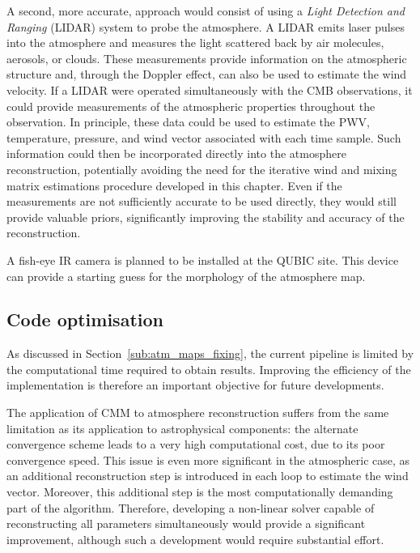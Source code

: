 \documentclass[../../thesis.tex]{subfiles}
\begin{document}
A second, more accurate, approach would consist of using a \emph{Light Detection and Ranging} (LIDAR) system to probe the atmosphere. A LIDAR emits laser pulses into the atmosphere and measures the light scattered back by air molecules, aerosols, or clouds. These measurements provide information on the atmospheric structure and, through the Doppler effect, can also be used to estimate the wind velocity.
If a LIDAR were operated simultaneously with the CMB observations, it could provide measurements of the atmospheric properties throughout the observation. In principle, these data could be used to estimate the PWV, temperature, pressure, and wind vector associated with each time sample. Such information could then be incorporated directly into the atmosphere reconstruction, potentially avoiding the need for the iterative wind and mixing matrix estimations procedure developed in this chapter. Even if the measurements are not sufficiently accurate to be used directly, they would still provide valuable priors, significantly improving the stability and accuracy of the reconstruction.

A fish-eye IR camera is planned to be installed at the QUBIC site. This device can provide a starting guess for the morphology of the atmosphere map.

\subsection{Code optimisation}

As discussed in Section~\ref{sub:atm_maps_fixing}, the current pipeline is limited by the computational time required to obtain results. Improving the efficiency of the implementation is therefore an important objective for future developments.

The application of CMM to atmosphere reconstruction suffers from the same limitation as its application to astrophysical components: the alternate convergence scheme leads to a very high computational cost, due to its poor convergence speed. This issue is even more significant in the atmospheric case, as an additional reconstruction step is introduced in each loop to estimate the wind vector. Moreover, this additional step is the most computationally demanding part of the algorithm. Therefore, developing a non-linear solver capable of reconstructing all parameters simultaneously would provide a significant improvement, although such a development would require substantial effort.
\end{document}
